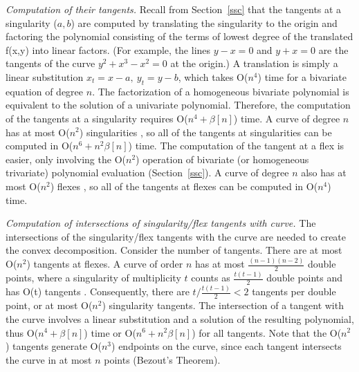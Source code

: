 {\em Computation of their tangents.} 
%
Recall from Section~\ref{ssc} that the tangents at a singularity ($a, b$) are computed by 
translating the singularity to the origin and factoring the polynomial consisting of 
the terms of lowest degree of the translated f(x,y) into linear factors.
(For example, the lines $y-x=0$ and $y+x=0$ are the tangents of the curve
$y^{2} + x^{3} - x^{2} = 0$ at the origin.)
A translation is simply a linear substitution $x_{t} = x - a ,\ y_{t} = y - b$,
which takes O($n^{4}$) time for a bivariate equation of degree $n$.
The factorization of a homogeneous bivariate polynomial is equivalent to the
solution of a univariate polynomial.
Therefore, the computation of the tangents at a singularity requires
O($n^{4} + \beta[n]$) time.
A curve of degree $n$ has at most O($n^2$) singularities \cite{walker},
so all of the tangents at singularities can be computed in O($n^{6} + n^{2}\beta[n]$)
time.
The computation of the tangent at a flex is easier, only involving the O($n^{2}$)
operation of bivariate (or homogeneous trivariate) polynomial evaluation 
(Section~\ref{ssc}).
A curve of degree $n$ also has at most O($n^{2}$) flexes \cite{walker},
so all of the tangents at flexes can be computed in O($n^{4}$) time.

{\em Computation of intersections of singularity/flex tangents with curve.}
%
The intersections of the singularity/flex tangents with the curve are needed to
create the convex decomposition.
Consider the number of tangents.
There are at most O($n^{2}$) tangents at flexes.
A curve of order $n$ has at most $\frac{(n-1)(n-2)}{2}$ double points, where
a singularity of multiplicity $t$ counts as $\frac{t(t-1)}{2}$ double points 
and has O(t) tangents \cite{walker}.
Consequently, there are $t / \frac{t(t-1)}{2} < 2$ tangents per double point,
or at most O($n^{2}$) singularity tangents.
The intersection of a tangent with the curve involves a linear substitution
and a solution of the resulting polynomial, thus O($n^{4} + \beta[n]$) time or
O($n^{6} + n^{2}\beta[n]$) for all tangents.
Note that the O($n^{2}$) tangents generate O($n^{3}$) endpoints on the curve, since
each tangent intersects the curve in at most $n$ points (Bezout's Theorem).

